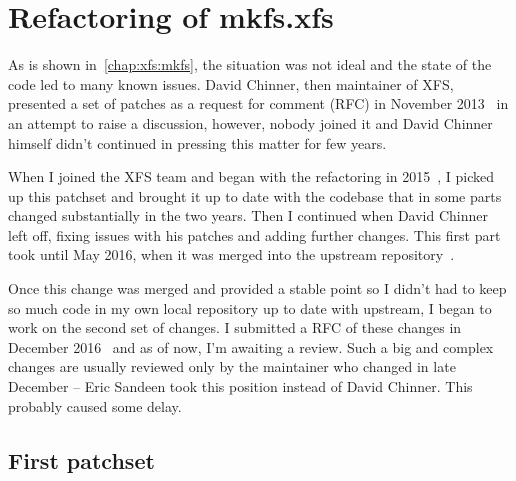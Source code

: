 \chapter{Refactoring of mkfs.xfs} \label{chap:refactoring}
As is shown in~\ref{chap:xfs:mkfs}, the situation was not ideal and the state of the code led to many known issues. David Chinner, then maintainer of XFS, presented a set of patches as a request for comment (RFC) in November 2013~\cite{davidsPatches} in an attempt to raise a discussion, however, nobody joined it and David Chinner himself didn't continued in pressing this matter for few years.

When I joined the XFS team and began with the refactoring in 2015~\cite{myFirstPatches}, I picked up this patchset and brought it up to date with the codebase that in some parts changed substantially in the two years. Then I continued when David Chinner left off, fixing issues with his patches and adding further changes. This first part took until May 2016, when it was merged into the upstream repository~\cite{finalPatchset1,finalPatchset1Announce}.

Once this change was merged and provided a stable point so I didn't had to keep so much code in my own local repository up to date with upstream, I began to work on the second set of changes. I submitted a RFC of these changes in December 2016~\cite{secondSetRFC} and as of now, I'm awaiting a review. Such a big and complex changes are usually reviewed only by the maintainer who changed in late December -- Eric Sandeen took this position instead of David Chinner. This probably caused some delay.

\section{First patchset}\label{chap:refactoring:first}





